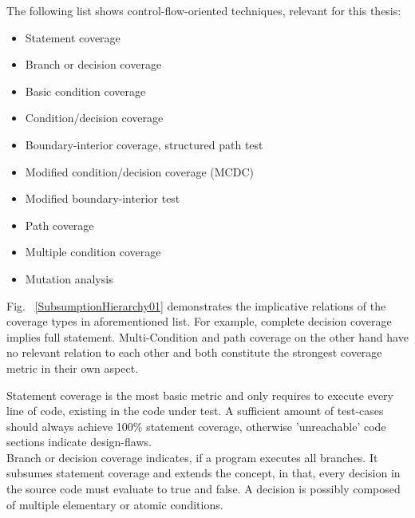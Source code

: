 	The following list shows control-flow-oriented techniques, relevant for this thesis:
	\begin{itemize} \setlength\itemsep{1px}
		\item Statement coverage
		\item Branch or decision coverage
		\item Basic condition coverage
		\item Condition/decision coverage
	\item Boundary-interior coverage, structured path test
		\item Modified condition/decision coverage (MCDC)
		\item Modified boundary-interior test
		\item Path coverage
		\item Multiple condition coverage
		\item Mutation analysis \\
	\end{itemize} 

	Fig. ~\ref{SubsumptionHierarchy01} demonstrates the implicative relations of the coverage types in aforementioned list. For example, complete decision coverage implies	full statement. Multi-Condition and path coverage on the other hand have no relevant relation to each other and both constitute the strongest coverage metric in their own aspect. \\
	

	Statement coverage is the most basic metric and only requires to execute every line of code, existing in the code under test. A sufficient amount of test-cases should always achieve 100\% statement coverage, otherwise 'unreachable' code sections indicate design-flaws. \\
	
	Branch or decision coverage indicates, if a program executes all branches. It subsumes statement coverage and extends the concept, in that, every decision in the source code must evaluate to true and false. A decision is possibly composed of multiple elementary or atomic conditions. \\
	
